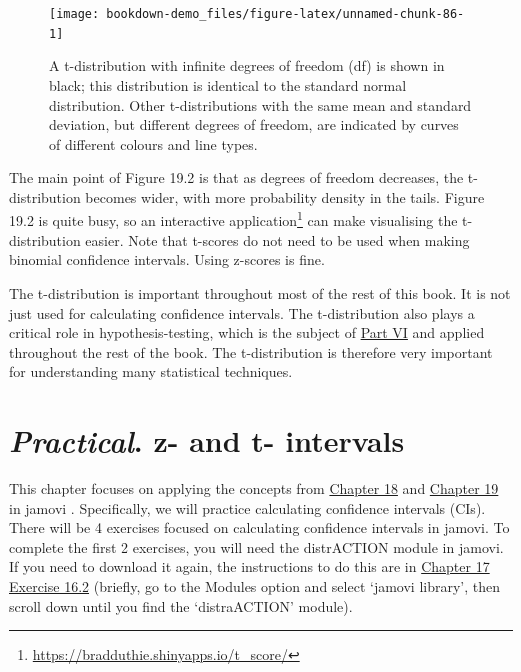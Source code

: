\documentclass[
]{scrbook}
\begin{document}
\begin{figure}
\texttt{[image: bookdown-demo\_files/figure-latex/unnamed-chunk-86-1]} \caption{A t-distribution with infinite degrees of freedom (df) is shown in black; this distribution is identical to the standard normal distribution. Other t-distributions with the same mean and standard deviation, but different degrees of freedom, are indicated by curves of different colours and line types.}\label{fig:unnamed-chunk-86}
\end{figure}

The main point of Figure 19.2 is that as degrees of freedom decreases, the t-distribution becomes wider, with more probability density in the tails.
Figure 19.2 is quite busy, so an interactive application\footnote{\url{https://bradduthie.shinyapps.io/t_score/}} can make visualising the t-distribution easier.
Note that t-scores do not need to be used when making binomial confidence intervals.
Using z-scores is fine.

The t-distribution is important throughout most of the rest of this book.
It is not just used for calculating confidence intervals.
The t-distribution also plays a critical role in hypothesis-testing, which is the subject of \protect\hyperlink{Week_6}{Part VI} and applied throughout the rest of the book.
The t-distribution is therefore very important for understanding many statistical techniques.

\hypertarget{Chapter_20}{%
\chapter{\texorpdfstring{\emph{Practical}. z- and t- intervals}{Practical. z- and t- intervals}}\label{Chapter_20}}

This chapter focuses on applying the concepts from \protect\hyperlink{Chapter_18}{Chapter 18} and \protect\hyperlink{Chapter_19}{Chapter 19} in jamovi \citep{Jamovi2022}.
Specifically, we will practice calculating confidence intervals (CIs).
There will be 4 exercises focused on calculating confidence intervals in jamovi.
To complete the first 2 exercises, you will need the distrACTION module in jamovi.
If you need to download it again, the instructions to do this are in \protect\hyperlink{Chapter_17}{Chapter 17} \href{https://bradduthie.github.io/SCIU4T4/Chapter_17.html\#probabilities-from-a-normal-distribution}{Exercise 16.2} (briefly, go to the Modules option and select `jamovi library', then scroll down until you find the `distraACTION' module).
\end{document}
